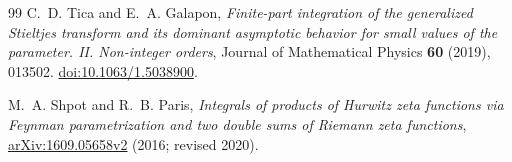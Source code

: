 \begin{thebibliography}{99}
C.~D. Tica and E.~A. Galapon,
\emph{Finite-part integration of the generalized Stieltjes transform
and its dominant asymptotic behavior for small values of the parameter.
II. Non-integer orders}, Journal of Mathematical Physics
\textbf{60} (2019), 013502.
\href{https://doi.org/10.1063/1.5038900}{doi:10.1063/1.5038900}.

M.~A. Shpot and R.~B. Paris,
\emph{Integrals of products of Hurwitz zeta functions via Feynman
parametrization and two double sums of Riemann zeta functions},
\href{https://arxiv.org/abs/1609.05658v2}{arXiv:1609.05658v2}
(2016; revised 2020).

\end{thebibliography}

